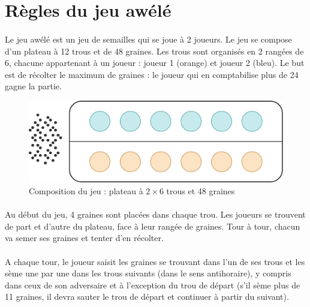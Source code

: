 \documentclass{article}
\begin{document}
    \newpage
    \section{Règles du jeu awélé}

    \paragraph{}
    Le jeu awélé est un jeu de semailles qui se joue à 2 joueurs.     Le jeu se compose d'un plateau à 12 trous et de 48 graines. Les trous sont organisés en 2 rangées de 6, chacune appartenant à un joueur : joueur 1 (orange) et joueur 2 (bleu). Le but est de récolter le maximum de graines : le joueur qui en comptabilise plus de 24 gagne la partie.

    \begin{figure}[H]
        \centering
        \includegraphics[width=.55\linewidth]{./images/rules-composition.png}
        \caption{Composition du jeu : plateau à $2 \times 6$ trous et 48 graines}
    \end{figure}

    \paragraph{}
    Au début du jeu, 4 graines sont placées dans chaque trou. Les joueurs se trouvent de part et d'autre du plateau, face à leur rangée de graines. Tour à tour, chacun va semer ses graines et tenter d'en récolter. 
    
    \paragraph{}
    A chaque tour, le joueur saisit les graines se trouvant dans l'un de ses trous et les sème une par une dans les trous suivants (dans le sens antihoraire), y compris dans ceux de son adversaire et à l'exception du trou de départ (s'il sème plus de 11 graines, il devra sauter le trou de départ et continuer à partir du suivant).
\end{document}
